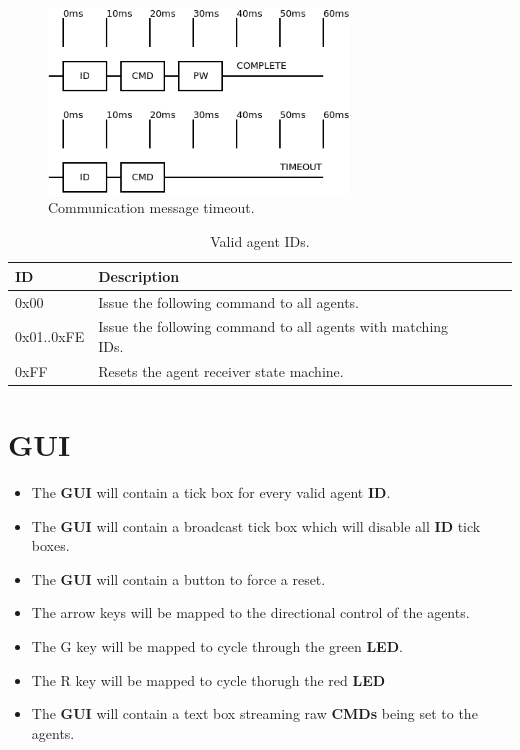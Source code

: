 \documentclass[a4paper]{article}
\begin{document}
\begin{figure}[h]
   \centering
   \label{fig_communications_wave}
   \includegraphics[width=8cm,keepaspectratio]{communications/communications_wave.png} 
   \caption{Communication message timeout.}
\end{figure}



\begin{table}[h]
   \centering
   \caption{Valid agent IDs.}
   \label{tab_ids}
   \begin{tabular}{|l|l|l|l|l|l|}
        \hline
        \textbf{ID}  &  \textbf{Description} \\ \hline  
         0x00        &  Issue the following command to all agents.\\ \hline  
         0x01..0xFE  &  Issue the following command to all agents with matching IDs.\\ \hline  
         0xFF        &  Resets the agent receiver state machine. \\ \hline  
   \end{tabular}
\end{table}



\section{GUI}
   \begin{itemize}
      \item The \textbf{GUI} will contain a tick box for every valid agent \textbf{ID}. 
      \item The \textbf{GUI} will contain a broadcast tick box which will disable all \textbf{ID}
            tick boxes.
      \item The \textbf{GUI} will contain a button to force a reset. 
      \item The arrow keys will be mapped to the directional control of the agents.
      \item The G key will be mapped to cycle through the green \textbf{LED}.
      \item The R key will be mapped to cycle thorugh the red \textbf{LED}
      \item The \textbf{GUI} will contain a text box streaming raw \textbf{CMDs} being set to the agents.
   \end{itemize}
\end{document}
